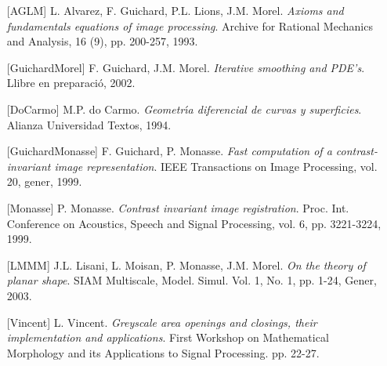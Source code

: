 \documentclass{article}
\begin{document}
\begin{enumerate}
\item[]
[AGLM] L. Alvarez, F. Guichard, P.L. Lions, J.M. Morel. {\it Axioms and fundamentals equations of image processing}.
Archive for Rational Mechanics and Analysis, 16 (9), pp. 200-257, 1993.
\item[]
[GuichardMorel] F. Guichard, J.M. Morel. {\it Iterative smoothing and PDE's}. Llibre en preparaci\'o, 2002.
\item[]
[DoCarmo] M.P. do Carmo. {\it Geometr\'\i a diferencial de curvas y superficies}. Alianza Universidad Textos, 1994.
\item[]
[GuichardMonasse] F. Guichard, P. Monasse. {\it Fast computation of a contrast-invariant image representation}.
IEEE Transactions on Image Processing, vol. 20, gener, 1999.
\item[]
[Monasse] P. Monasse. {\it Contrast invariant image registration}. Proc. Int. Conference on Acoustics, Speech 
and Signal Processing, vol. 6, pp. 3221-3224, 1999. 
\item[]
[LMMM] J.L. Lisani, L. Moisan, P. Monasse, J.M. Morel. {\it On the theory of planar shape}. 
SIAM Multiscale, Model. Simul. Vol. 1, No. 1, pp. 1-24, Gener, 2003. 
\item[]
[Vincent] L. Vincent. {\it Greyscale area openings and closings, their implementation and applications}. 
First Workshop on Mathematical Morphology and its Applications to Signal Processing. pp. 22-27.
\end{enumerate}
\end{document}
